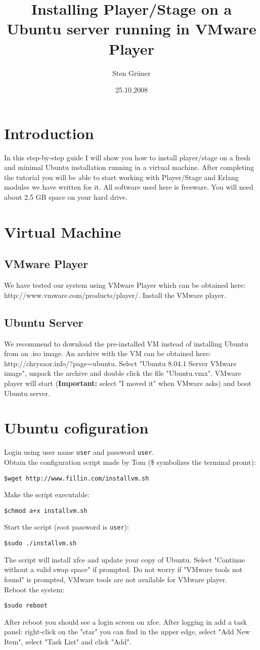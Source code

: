 \documentclass[a4paper,11pt,dvips]{article}
\title{Installing Player/Stage on a Ubuntu server running in VMware Player}
\author{Sten Gr\"{u}ner}
\date{25.10.2008}
\begin{document}
\newcommand{\prompt}[1]{
	\begin{center}
	\texttt{\$#1}
	\end{center}
}

\maketitle

\section{Introduction}
In this step-by-step guide I will show you how to install player/stage on a fresh and minimal Ubuntu installation running in a virtual machine. After completing the tutorial you will be able to start working with Player/Stage and Erlang modules we have written for it. All software used here is freeware. You will need about 2.5 GB space on your hard drive.

\section{Virtual Machine}
\subsection{VMware Player}
We have tested our system using VMware Player which can be obtained here: http://www.vmware.com/products/player/. Install the VMware player.
\subsection{Ubuntu Server}
We recommend to download the pre-installed VM instead of installing Ubuntu from an .iso image. An archive with the VM can be obtained here: \\ http://chrysaor.info/?page=ubuntu. Select "Ubuntu 8.04.1 Server VMware image", unpack the archive and double click the file "Ubuntu.vmx". VMware player will start (\textbf{Important:} select "I moved it" when VMware asks) and boot Ubuntu server.

\section{Ubuntu cofiguration}
Login using user name \texttt{user} and password \texttt{user}. 
\\Obtain the configuration script made by Tom (\$ symbolizes the terminal promt): 
\prompt{wget http://www.fillin.com/installvm.sh}
Make the script executable:
\prompt{chmod a+x installvm.sh}
Start the script (root password is \texttt{user}):
\prompt{sudo ./installvm.sh}
The script will install xfce and update your copy of Ubuntu. Select "Continue without a valid swap space" if prompted. Do not worry if "VMware tools not found" is prompted, VMware tools are not available for VMware player.
\\
Reboot the system:
\prompt{sudo reboot}
After reboot you should see a login screen on xfce. After logging in add a task panel: right-click on the "star" you can find in the upper edge, select "Add New Item", select "Task List" and click "Add".
\end{document}
